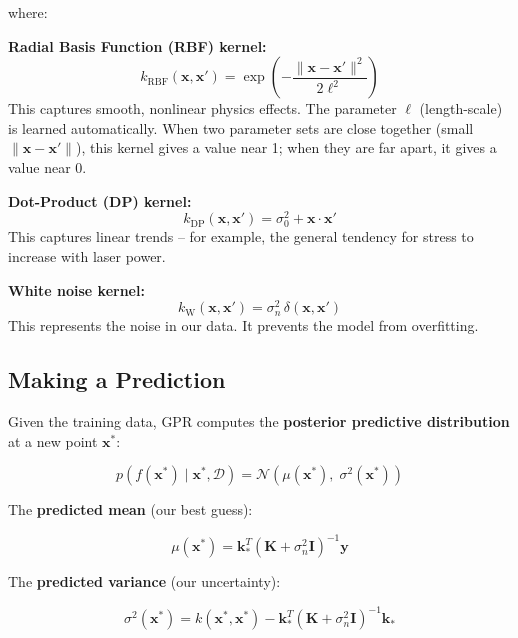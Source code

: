 \documentclass[12pt,a4paper]{report}
\begin{document}
where:

\textbf{Radial Basis Function (RBF) kernel:}
\begin{equation}
k_{\text{RBF}}(\mathbf{x}, \mathbf{x}') = \exp\!\left(-\frac{\|\mathbf{x} - \mathbf{x}'\|^2}{2\ell^2}\right)
\end{equation}
This captures smooth, nonlinear physics effects. The parameter $\ell$ (length-scale) is learned automatically. When two parameter sets are close together (small $\|\mathbf{x} - \mathbf{x}'\|$), this kernel gives a value near 1; when they are far apart, it gives a value near 0.

\textbf{Dot-Product (DP) kernel:}
\begin{equation}
k_{\text{DP}}(\mathbf{x}, \mathbf{x}') = \sigma_0^2 + \mathbf{x} \cdot \mathbf{x}'
\end{equation}
This captures linear trends -- for example, the general tendency for stress to increase with laser power.

\textbf{White noise kernel:}
\begin{equation}
k_{\text{W}}(\mathbf{x}, \mathbf{x}') = \sigma_n^2 \,\delta(\mathbf{x}, \mathbf{x}')
\end{equation}
This represents the noise in our data. It prevents the model from overfitting.

\subsection{Making a Prediction}

Given the training data, GPR computes the \textbf{posterior predictive distribution} at a new point $\mathbf{x}^*$:

\begin{equation}
p(f(\mathbf{x}^*) \mid \mathbf{x}^*, \mathcal{D}) = \mathcal{N}\!\left(\mu(\mathbf{x}^*),\; \sigma^2(\mathbf{x}^*)\right)
\end{equation}

The \textbf{predicted mean} (our best guess):

\begin{equation}
\mu(\mathbf{x}^*) = \mathbf{k}_*^T \left(\mathbf{K} + \sigma_n^2 \mathbf{I}\right)^{-1} \mathbf{y}
\label{eq:gpr_mean}
\end{equation}

The \textbf{predicted variance} (our uncertainty):

\begin{equation}
\sigma^2(\mathbf{x}^*) = k(\mathbf{x}^*, \mathbf{x}^*) - \mathbf{k}_*^T \left(\mathbf{K} + \sigma_n^2 \mathbf{I}\right)^{-1} \mathbf{k}_*
\label{eq:gpr_var}
\end{equation}
\end{document}

